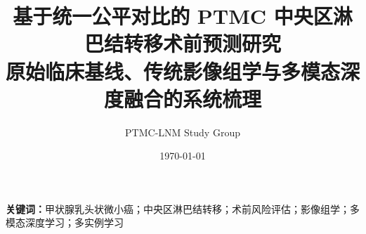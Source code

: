\documentclass[12pt,a4paper]{ctexart}
\title{基于统一公平对比的 PTMC 中央区淋巴结转移术前预测研究\\原始临床基线、传统影像组学与多模态深度融合的系统梳理}
\author{PTMC-LNM Study Group}
\date{\today}
\begin{document}
\maketitle

\begin{abstract}

\end{abstract}

\noindent\textbf{关键词：}甲状腺乳头状微小癌；中央区淋巴结转移；术前风险评估；影像组学；多模态深度学习；多实例学习






\end{document}
